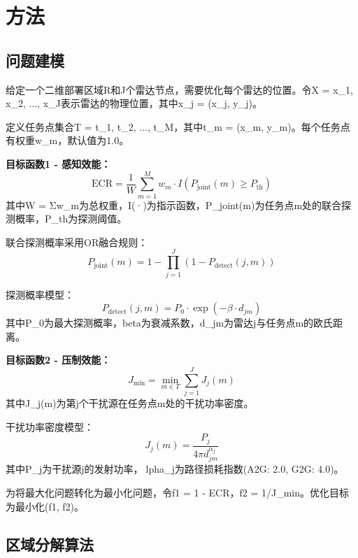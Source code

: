 \section{方法}
\label{sec:method}

\subsection{问题建模}

给定一个二维部署区域R和J个雷达节点，需要优化每个雷达的位置。令X = {x\_1, x\_2, ..., x\_J}表示雷达的物理位置，其中x\_j = (x\_j, y\_j)。

定义任务点集合T = {t\_1, t\_2, ..., t\_M}，其中t\_m = (x\_m, y\_m)。每个任务点有权重w\_m，默认值为1.0。

\textbf{目标函数1 - 感知效能：}
\begin{equation}
    \text{ECR} = \frac{1}{W} \sum_{m=1}^{M} w_m \cdot I\left(P_{\text{joint}}(m) \geq P_{\text{th}}\right)
\end{equation}
其中W = Σw\_m为总权重，I(·)为指示函数，P\_joint(m)为任务点m处的联合探测概率，P\_th为探测阈值。

联合探测概率采用OR融合规则：
\begin{equation}
    P_{\text{joint}}(m) = 1 - \prod_{j=1}^{J} (1 - P_{\text{detect}}(j, m))
\end{equation}

探测概率模型：
\begin{equation}
    P_{\text{detect}}(j, m) = P_0 \cdot \exp(-\beta \cdot d_{jm})
\end{equation}
其中P\_0为最大探测概率，beta为衰减系数，d\_jm为雷达j与任务点m的欧氏距离。

\textbf{目标函数2 - 压制效能：}
\begin{equation}
    J_{\text{min}} = \min_{m \in T} \sum_{j=1}^{J} J_j(m)
\end{equation}
其中J\_j(m)为第j个干扰源在任务点m处的干扰功率密度。

干扰功率密度模型：
\begin{equation}
    J_j(m) = \frac{P_j}{4\pi d_{jm}^{\alpha_j}}
\end{equation}
其中P\_j为干扰源j的发射功率，lpha\_j为路径损耗指数(A2G: 2.0, G2G: 4.0)。

为将最大化问题转化为最小化问题，令f1 = 1 - ECR，f2 = 1/J\_min。优化目标为最小化(f1, f2)。

\subsection{区域分解算法}

